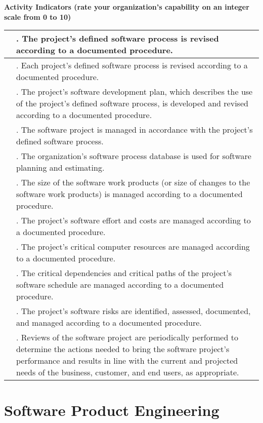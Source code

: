 \documentclass{article}
\newcounter{activity}
\newenvironment{KPAActivity}
	{
	 \setcounter{activity}{0}
	 {\bf Activity Indicators (rate your organization's capability
	 on an integer scale from 0 to 10)}
	 \begin{center}
	 \begin{tabular}{|p{0.5in}|p{6.0in}|} \hline
	}
	{
	 \end{tabular}
	 \end{center}
	}
\newcommand{\Activity}[2]{\stepcounter{activity} #1 &
\arabic{activity}. #2 \\ \hline}
\begin{document}
\begin{KPAActivity}
\Activity{}{The project's defined software process is revised
according to a documented procedure.}
\Activity{}{Each project's defined software process is revised
according to a documented procedure.}
\Activity{}{The project's software development plan, which describes
the use of the project's defined software process, is developed and
revised according to a documented procedure.}
\Activity{}{The software project is managed in accordance with the
project's defined software process.}
\Activity{}{The organization's software process database is used for
software planning and estimating.}
\Activity{}{The size of the software work products (or size of changes
to the software work products) is managed according to a documented
procedure.}
\Activity{}{The project's software effort and costs are managed
according to a documented procedure.}
\Activity{}{The project's critical computer resources are managed
according to a documented procedure.}
\Activity{}{The critical dependencies and critical paths of the
project's software schedule are managed according to a documented
procedure.}
\Activity{}{The project's software risks are identified, assessed,
documented, and managed according to a documented procedure.}
\Activity{}{Reviews of the software project are periodically performed
to determine the actions needed to bring the software project's
performance and results in line with the current and projected needs
of the business, customer, and end users, as appropriate.}
\end{KPAActivity}

\newpage
\section{Software Product Engineering}
\end{document}
